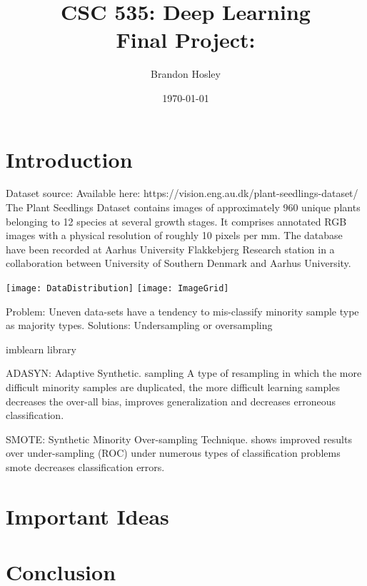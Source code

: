 \documentclass[]{article}
\title{CSC 535: Deep Learning \\ Final Project: \\ }
\author{Brandon Hosley}
\date{\today}
\begin{document}
	\maketitle
	\clearpage
	
\begin{abstract}
	
\end{abstract}
	
\section{Introduction} 

Dataset source:
Available here: https://vision.eng.au.dk/plant-seedlings-dataset/
\cite{Giselsson2017}
The Plant Seedlings Dataset contains images of approximately 960 unique plants belonging to 12 species at several growth stages.
It comprises annotated RGB images with a physical resolution of roughly 10 pixels per mm.
The database have been recorded at Aarhus University Flakkebjerg Research station in a collaboration between University of Southern Denmark and Aarhus University.


\texttt{[image: DataDistribution]}
\texttt{[image: ImageGrid]}

Problem: Uneven data-sets have a tendency to mis-classify minority sample type as majority types.
Solutions: Undersampling or oversampling

imblearn library

ADASYN: Adaptive Synthetic. sampling
\cite{Bai2008} 
A type of resampling in which the more difficult minority samples are duplicated,
the more difficult learning samples decreases the over-all bias, improves generalization and decreases erroneous classification.

SMOTE: Synthetic Minority Over-sampling Technique.
\cite{Bowyer2011} shows improved results over under-sampling (ROC)
under numerous types of classification problems smote decreases classification errors.

\section{Important Ideas}
	\subsection{}
	


	
\section{Conclusion}

\clearpage


\end{document}
